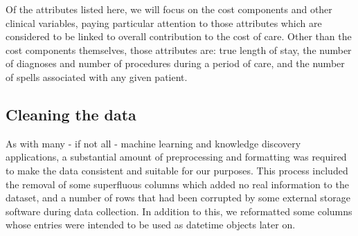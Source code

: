 Of the attributes listed here, we will focus on the cost components and other
clinical variables, paying particular attention to those attributes which are
considered to be linked to overall contribution to the cost of care. Other than
the cost components themselves, those attributes are: true length of stay,
the number of diagnoses and number of procedures during a period of care, and
the number of spells associated with any given patient.

\subsection{Cleaning the data}\label{subsec:formatting}

As with many \-- if not all \-- machine learning and knowledge discovery
applications, a substantial amount of preprocessing and formatting was required
to make the data consistent and suitable for our purposes. This process included
the removal of some superfluous columns which added no real information to the
dataset, and a number of rows that had been corrupted by some external storage
software during data collection. In addition to this, we reformatted some
columns whose entries were intended to be used as datetime objects later on.
